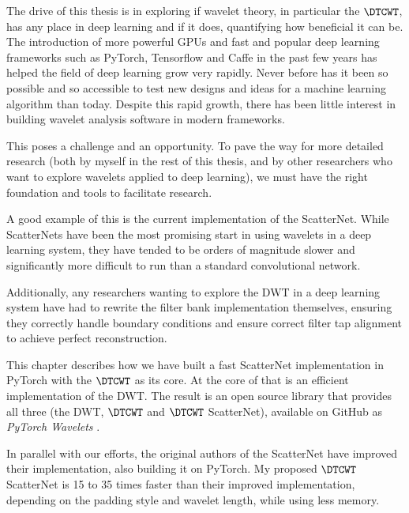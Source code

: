 The drive of this thesis is in exploring if wavelet theory, in
particular the $\DTCWT$, has any place in deep learning and if it does,
quantifying how beneficial it can be. The introduction of more powerful GPUs and
fast and popular deep learning frameworks such as PyTorch, Tensorflow and Caffe
in the past few years has helped the field of deep learning grow very rapidly.
Never before has it been so possible and so accessible to test new designs and
ideas for a machine learning algorithm than today. Despite this rapid growth,
there has been little interest in building wavelet analysis software in modern
frameworks. 

This poses a challenge and an opportunity. To pave the way for more detailed 
research (both by myself in the rest of this thesis, and by other researchers
who want to explore wavelets applied to deep learning), we must have the right
foundation and tools to facilitate research.

A good example of this is the current implementation of the ScatterNet. While
ScatterNets have been the most promising start in using wavelets in a deep
learning system, they have tended to be orders of magnitude slower and significantly more
difficult to run than a standard convolutional network. 

Additionally, any researchers wanting to explore the DWT in a deep learning
system have had to rewrite the filter bank implementation themselves, ensuring they
correctly handle boundary conditions and ensure correct filter tap alignment to
achieve perfect reconstruction.

This chapter describes how we have built a fast ScatterNet implementation in 
PyTorch with the $\DTCWT$ as its core. At the core of that is an efficient 
implementation of the DWT\@. The result is an open source library that provides
all three (the DWT, $\DTCWT$ and $\DTCWT$ ScatterNet), available on GitHub as
\emph{PyTorch Wavelets} \cite{pytorch_wavelets}.

In parallel with our efforts, the original authors of the ScatterNet have
improved their implementation, also building it on PyTorch. My proposed
$\DTCWT$ ScatterNet is 15 to 35 times faster than their improved implementation,
depending on the padding style and wavelet length, while using less memory. 
